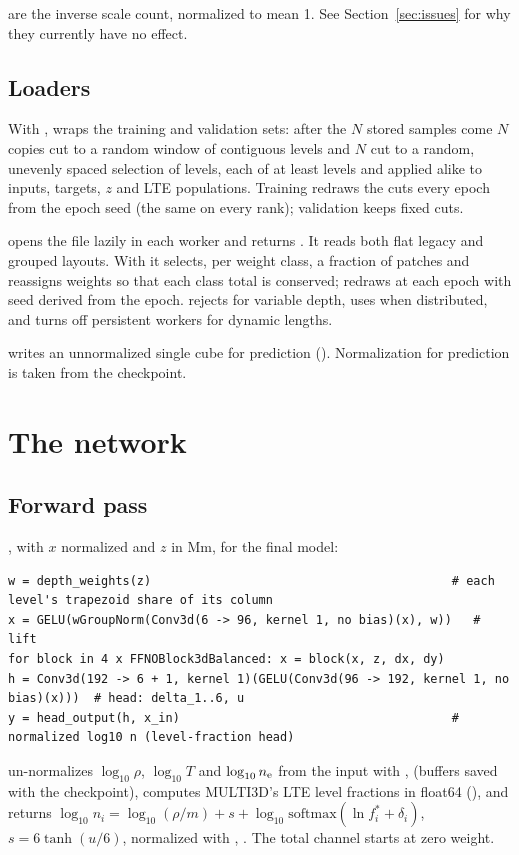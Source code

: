  are the inverse scale count, normalized to mean 1. See Section~\ref{sec:issues} for why they currently have no effect.

\subsection{Loaders}
With ,  wraps the training and validation sets: after the $N$ stored samples come $N$ copies cut to a random window of contiguous levels and $N$ cut to a random, unevenly spaced selection of levels, each of at least  levels and applied alike to inputs, targets, $z$ and LTE populations. Training redraws the cuts every epoch from the epoch seed (the same on every rank); validation keeps fixed cuts.

 opens the file lazily in each worker and returns . It reads both flat legacy and grouped layouts. With  it selects, per weight class, a fraction of patches and reassigns weights so that each class total is conserved;  redraws at each epoch with seed derived from the epoch.  rejects  for variable depth, uses  when distributed, and turns off persistent workers for dynamic lengths.

 writes an unnormalized single cube for prediction (). Normalization for prediction is taken from the checkpoint.

\section{The network}

\subsection{Forward pass}
, with $x$ \code{[B,6,D,H,W]} normalized and $z$ \code{[B,D,H,W]} in Mm, for the final model:
\begin{lstlisting}
w = depth_weights(z)                                          # each level's trapezoid share of its column
x = GELU(wGroupNorm(Conv3d(6 -> 96, kernel 1, no bias)(x), w))   # lift
for block in 4 x FFNOBlock3dBalanced: x = block(x, z, dx, dy)
h = Conv3d(192 -> 6 + 1, kernel 1)(GELU(Conv3d(96 -> 192, kernel 1, no bias)(x)))  # head: delta_1..6, u
y = head_output(h, x_in)                                      # normalized log10 n (level-fraction head)
\end{lstlisting}
 un-normalizes $\log_{10}\rho$, $\log_{10}T$ and $\log_{10}n_{\rm e}$ from the input with ,  (buffers saved with the checkpoint), computes MULTI3D's LTE level fractions in float64 (), and returns $\log_{10}n_i=\log_{10}(\rho/m)+s+\log_{10}\mathrm{softmax}(\ln f^*_i+\delta_i)$, $s=6\tanh(u/6)$, normalized with , . The total channel  starts at zero weight.

